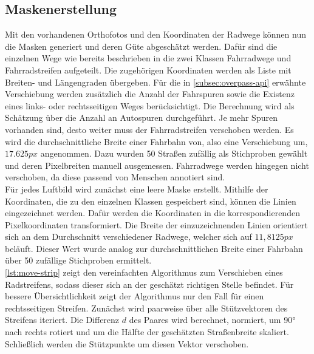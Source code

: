 \subsection{Maskenerstellung}

Mit den vorhandenen Orthofotos und den Koordinaten der Radwege können nun die Masken generiert 
und deren Güte abgeschätzt werden.
Dafür sind die einzelnen Wege wie bereits beschrieben in die zwei Klassen Fahrradwege und Fahrradstreifen aufgeteilt.
Die zugehörigen Koordinaten werden als Liste mit Breiten- und Längengraden übergeben.
Für die in \autoref{subsec:overpass-api} erwähnte Verschiebung werden zusätzlich die Anzahl der Fahrspuren sowie die Existenz eines links- oder rechtsseitigen Weges berücksichtigt.
Die Berechnung wird als Schätzung über die Anzahl an Autospuren durchgeführt.
Je mehr Spuren vorhanden sind, desto weiter muss der Fahrradstreifen verschoben werden.
Es wird die durchschnittliche Breite einer Fahrbahn von, also eine Verschiebung um, $17.625px$ angenommen. 
Dazu wurden 50 Straßen zufällig als Stichproben gewählt und deren Pixelbreiten manuell ausgemessen. 
Fahrradwege werden hingegen nicht verschoben, da diese passend von Menschen annotiert sind.\\
Für jedes Luftbild wird zunächst eine leere Maske erstellt.
Mithilfe der Koordinaten, die zu den einzelnen Klassen gespeichert sind, können die Linien eingezeichnet werden.
Dafür werden die Koordinaten in die korrespondierenden Pixelkoordinaten transformiert.
Die Breite der einzuzeichnenden Linien orientiert sich an dem Durchschnitt verschiedener Radwege, welcher sich auf $11,8125px$ beläuft.
Dieser Wert wurde analog zur durchschnittlichen Breite einer Fahrbahn über 50 zufällige Stichproben ermittelt. \\
\autoref{lst:move-strip} zeigt den vereinfachten Algorithmus zum Verschieben eines Radstreifens,
sodass dieser sich an der geschätzt richtigen Stelle befindet. Für bessere Übersichtlichkeit 
zeigt der Algorithmus nur den Fall für einen rechtsseitigen Streifen. 
Zunächst wird paarweise über alle Stützvektoren des Streifens iteriert. Die Differenz $d$ des Paares 
wird berechnet, normiert, um 90° nach rechts rotiert und um die Hälfte der geschätzten Straßenbreite skaliert. 
Schließlich werden die Stützpunkte um diesen Vektor verschoben. 

